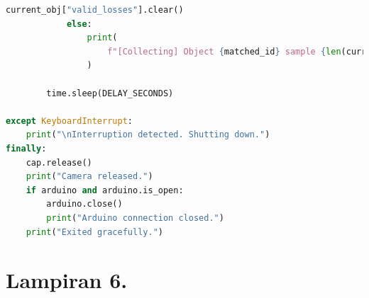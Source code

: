 \begin{lstlisting}[language=Python]
                current_obj["valid_losses"].clear()
            else:
                print(
                    f"[Collecting] Object {matched_id} sample {len(current_obj['valid_losses'])}/{LOSS_BATCH_SIZE}"
                )

        time.sleep(DELAY_SECONDS)

except KeyboardInterrupt:
    print("\nInterruption detected. Shutting down.")
finally:
    cap.release()
    print("Camera released.")
    if arduino and arduino.is_open:
        arduino.close()
        print("Arduino connection closed.")
    print("Exited gracefully.")
\end{lstlisting}

\newpage
\section*{Lampiran 6. }
\label{Lampiran 6}
